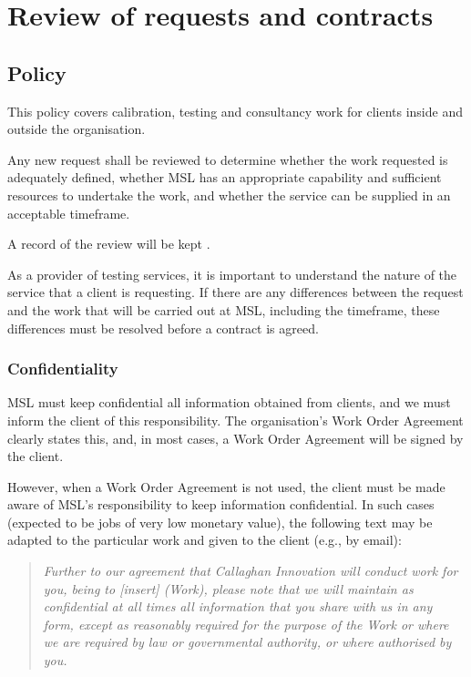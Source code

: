 \section{Review of requests and contracts}
\label{s:requests_and_tenders}
\subsection{Policy}
This policy covers calibration, testing and consultancy work for clients inside and outside the organisation.

Any new request shall be reviewed to determine whether the work requested is adequately defined, whether MSL has an appropriate capability and sufficient resources to undertake the work, and whether the service can be supplied in an acceptable timeframe.

A record of the review will be kept .

As a provider of testing services, it is important to understand the nature of the service that a client is requesting. If there are any differences between the request and the work that will be carried out at MSL, including the timeframe, these differences must be resolved before a contract is agreed.

\subsubsection{Confidentiality}
\label{sss:confidentiality}
MSL must keep confidential all information obtained from clients, and we must inform the client of this responsibility. The organisation’s Work Order Agreement clearly states this, and, in most cases, a Work Order Agreement will be signed by the client. 

However, when a Work Order Agreement is not used, the client must be made aware of MSL’s responsibility to keep information confidential. In such cases (expected to be jobs of very low monetary value), the following text may be adapted to the particular work and given to the client (e.g., by email):
\begin{quote}
\textit{Further to our agreement that Callaghan Innovation will conduct work for you, being to [insert] (Work), please note that we will maintain as confidential at all times all information that you share with us in any form, except as reasonably required for the purpose of the Work or where we are required by law or governmental authority, or where authorised by you.}
\end{quote}


